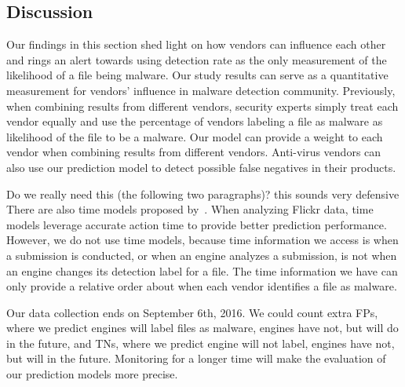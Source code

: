 \subsection{Discussion}
Our findings in this section shed light on how vendors can influence each other and rings an alert towards using detection rate as the only measurement of the likelihood of a file being malware.
Our study results can serve as a quantitative measurement for vendors' influence in malware detection community. 
Previously, when combining results from different vendors, 
security experts simply treat each vendor equally and use the percentage of 
vendors labeling a file as malware as likelihood of the file to be a malware. 
Our model can provide a weight to each vendor 
when combining results from different vendors.  
Anti-virus vendors can also use our prediction model to detect possible false negatives in their products.

{\color{red} Do we really need this (the following two paragraphs)? this sounds very defensive}
There are also time models proposed by~\citet{Influence}.
When analyzing Flickr data, time models leverage accurate action time to provide better prediction performance. 
However, we do not use time models, 
because time information we access is when a submission is conducted, 
or when an engine analyzes a submission, 
is not when an engine changes its detection label for a file.
The time information we have can only provide a relative order about when each vendor identifies a file as malware.  

Our data collection ends on September 6th, 2016. 
We could count extra FPs, where we predict engines will label files as malware, engines have not, but will do in the future, 
and TNs, where we predict engine will not label, engines have not, but will in the future. 
Monitoring \vt for a longer time will make the evaluation of our prediction models more precise. 

\fi

